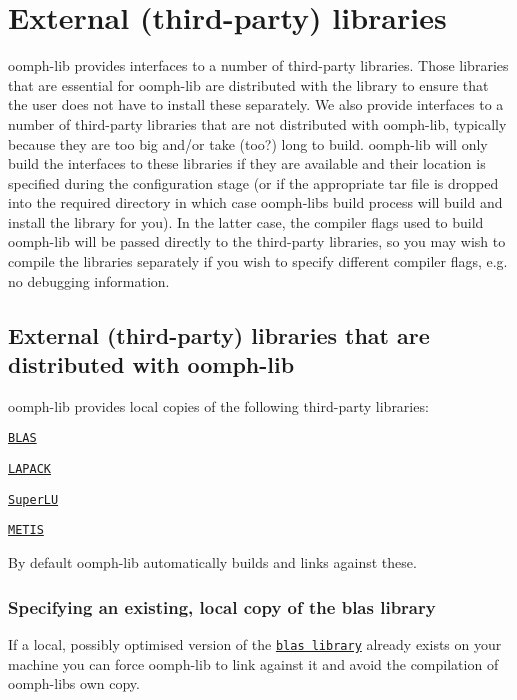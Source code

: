 \hypertarget{index_external}{}\section{External (third-\/party) libraries}\label{index_external}
{\ttfamily oomph-\/lib} provides interfaces to a number of third-\/party libraries. Those libraries that are essential for {\ttfamily oomph-\/lib} are distributed with the library to ensure that the user does not have to install these separately. We also provide interfaces to a number of third-\/party libraries that are not distributed with {\ttfamily oomph-\/lib}, typically because they are too big and/or take (too?) long to build. {\ttfamily oomph-\/lib} will only build the interfaces to these libraries if they are available and their location is specified during the configuration stage (or if the appropriate tar file is dropped into the required directory in which case {\ttfamily oomph-\/lib\textquotesingle{}s} build process will build and install the library for you). In the latter case, the compiler flags used to build {\ttfamily oomph-\/lib} will be passed directly to the third-\/party libraries, so you may wish to compile the libraries separately if you wish to specify different compiler flags, e.\+g. no debugging information.\hypertarget{index_external_src}{}\subsection{External (third-\/party) libraries that are distributed with oomph-\/lib}\label{index_external_src}
{\ttfamily oomph-\/lib} provides local copies of the following third-\/party libraries\+:
\begin{DoxyItemize}
\item \href{http://netlib.org/blas}{\tt B\+L\+AS}
\item \href{http://netlib.org/lapack}{\tt L\+A\+P\+A\+CK}
\item \href{http://crd.lbl.gov/~xiaoye/SuperLU}{\tt Super\+LU}
\item \href{http://www-users.cs.umn.edu/~karypis/metis/}{\tt M\+E\+T\+IS}
\end{DoxyItemize}By default {\ttfamily oomph-\/lib} automatically builds and links against these.\hypertarget{index_blas}{}\subsubsection{Specifying an existing, local copy of the blas library}\label{index_blas}
If a local, possibly optimised version of the \href{http://netlib.org/blas}{\tt blas library} already exists on your machine you can force {\ttfamily oomph-\/lib} to link against it and avoid the compilation of {\ttfamily oomph-\/lib\textquotesingle{}s} own copy.

